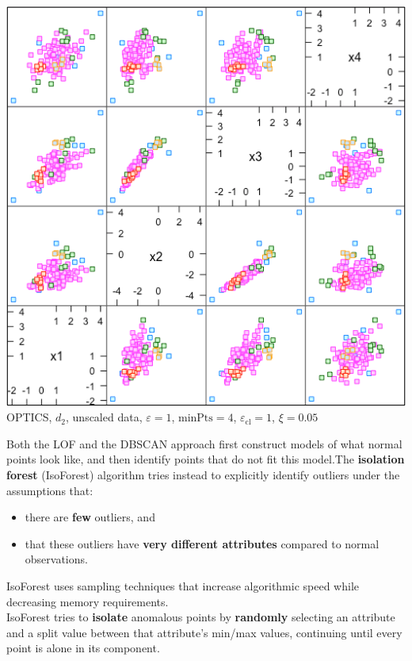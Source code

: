 \documentclass[20pt,landscape,footrule,headrule]{foils}
\newcommand{\newl}{\newline\newline}
\def\fh{\foilhead}
\begin{document}
{{\newpage \ 
\begin{center}
\includegraphics[height=0.85\textheight]{Images/xi_1} \\ 
OPTICS, $d_2$, unscaled data, $\varepsilon=1$, $\text{minPts}=4$, $\varepsilon_{\text{cl}}=1$, $\xi=0.05$
\end{center}


\fh{Isolation Forest}
\noindent Both the LOF and the DBSCAN approach first construct models of what normal points look like, and then identify points that do not fit this model.\newl The \textbf{isolation forest} (IsoForest) algorithm tries instead to explicitly identify outliers under the assumptions that:
\begin{itemize}
\item there are \textbf{few} outliers, and 
\item that these outliers have \textbf{very different attributes} compared to normal observations.
\end{itemize}
IsoForest uses sampling techniques that increase algorithmic speed while decreasing memory requirements.\newpage\ \\ \noindent IsoForest tries to \textbf{isolate} anomalous points by \textbf{randomly} selecting an attribute and a split value between that attribute's min/max values, continuing until every point is alone in its component.

}}
\end{document}
